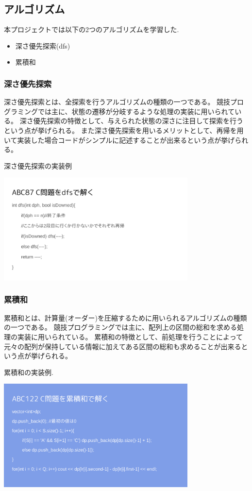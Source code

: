\documentclass[11pt,a4paper]{jsarticle}
\begin{document}
\subsection{アルゴリズム}
本プロジェクトでは以下の2つのアルゴリズムを学習した.
\begin{itemize}
    \item 深さ優先探索(dfs)
    \item 累積和
\end{itemize}

\subsubsection{深さ優先探索}
深さ優先探索とは、全探索を行うアルゴリズムの種類の一つである。
競技プログラミングでは主に、状態の遷移が分岐するような処理の実装に用いられている。
深さ優先探索の特徴として、与えられた状態の深さに注目して探索を行うという点が挙げられる。
また深さ優先探索を用いるメリットとして、再帰を用いて実装した場合コードがシンプルに記述することが出来るという点が挙げられる。

深さ優先探索の実装例

\includegraphics[width=10cm]{dfs.png}

\subsubsection{累積和}
累積和とは、計算量(オーダー)を圧縮するために用いられるアルゴリズムの種類の一つである。
競技プログラミングでは主に、配列上の区間の総和を求める処理の実装に用いられている。
累積和の特徴として、前処理を行うことによって元々の配列が保持している情報に加えてある区間の総和も求めることが出来るという点が挙げられる。

累積和の実装例.

\includegraphics[width=10cm]{ruisekiwa.png}
\end{document}
